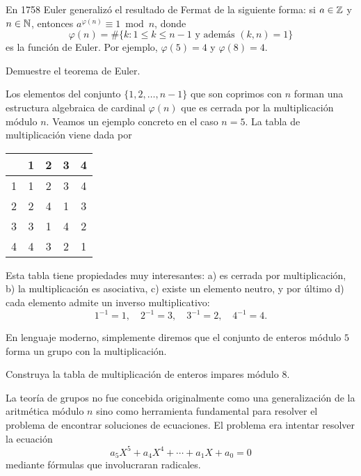 
En 1758 Euler generalizó el resultado de Fermat de la siguiente forma: si $a\in\mathbb{Z}$ y
$n\in\mathbb{N}$, entonces $a^{\varphi(n)}\equiv 1\bmod n$, donde 
\[
	\varphi(n)=\#\{k:1\leq k\leq n-1\text{ y además }(k,n)=1\}
\]
es la función de Euler. Por ejemplo, $\varphi(5)=4$ y $\varphi(8)=4$.

\begin{exercise}
	Demuestre el teorema de Euler.
\end{exercise}

Los elementos del conjunto $\{1,2,\dots,n-1\}$ que son coprimos con $n$ forman una estructura
algebraica de cardinal $\varphi(n)$ que es cerrada por la multiplicación módulo $n$. Veamos un ejemplo concreto en
el caso $n=5$. La tabla de multiplicación viene dada por 
\begin{table}
\begin{center}
	\begin{tabular}{c|cccc}
	  & 1 & 2 & 3 & 4 \\
	  \hline
	1 & 1 & 2 & 3 & 4 \\
	2 & 2 & 4 & 1 & 3 \\
	3 & 3 & 1 & 4 & 2 \\
	4 & 4 & 3 & 2 & 1
\end{tabular}
\end{center}
\end{table}

Esta tabla tiene propiedades muy interesantes: a) es cerrada por
multiplicación, b) la multiplicación es asociativa, c) existe un elemento
neutro, y por último d) cada elemento admite un inverso multiplicativo:
\[
	1^{-1}=1,\quad
	2^{-1}=3,\quad
	3^{-1}=2,\quad
	4^{-1}=4.
\]

En lenguaje moderno, simplemente diremos que el conjunto de enteros módulo $5$
forma un grupo con la multiplicación.

\begin{exercise}
	Construya la tabla de multiplicación de enteros impares módulo 8.
\end{exercise}

La teoría de grupos no fue concebida originalmente como una generalización de
la aritmética módulo $n$ sino como herramienta fundamental para resolver el
problema de encontrar soluciones de ecuaciones. El problema era intentar
resolver la ecuación
\[
	a_5X^5+a_4X^4+\cdots+a_1X+a_0=0
\]
mediante fórmulas que involucraran radicales. 

